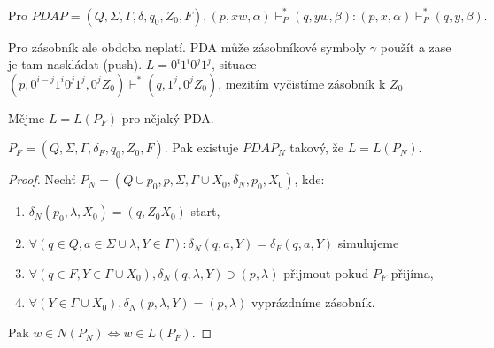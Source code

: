 \documentclass[../main.tex]{subfiles}
\begin{document}
    \begin{remark}
        \[\text{Pro } PDA P = (Q,\Sigma,\Gamma, \delta, q_0, Z_0, F), (p, xw, \alpha) \vdash^*_P (q, yw, \beta) : (p,x,\alpha)\vdash^*_P (q,y,\beta).\]

        Pro zásobník ale obdoba neplatí. PDA  může zásobníkové symboly $\gamma$ použít a zase je tam naskládat (push).
        $L = {0^i1^i0^j1^j}$, situace $(p, 0^{i-j}1^i0^j1^j, 0^jZ_0)\vdash^* (q,1^j, 0^j Z_0)$, mezitím vyčistíme zásobník k $Z_0$
    \end{remark}

    \begin{theorem}
        Mějme $L = L(P_F)$ pro nějaký PDA.

        $P_F = (Q,\Sigma, \Gamma, \delta_F, q_0, Z_0, F)$. Pak existuje $PDA P_N$ takový, že $L = L(P_N)$.

        \begin{proof}
            Nechť $P_N = (Q \cup {p_0, p}, \Sigma, \Gamma \cup {X_0}, \delta_N, p_0, X_0)$, kde:
            \begin{enumerate}
                \item $\delta_N(p_0,\lambda, X_0) = {(q,Z_0X_0)}$ start,
                \item $\forall(q\in Q, a \in \Sigma \cup {\lambda}, Y \in \Gamma) : \delta_N(q,a,Y) = \delta_F(q,a,Y)$ simulujeme
                \item $\forall(q \in F, Y \in \Gamma \cup {X_0}), \delta_N(q,\lambda, Y) \ni {(p,\lambda)}$ přijmout pokud $P_F$ přijíma,
                \item $\forall (Y \in \Gamma \cup {X_0}), \delta_N(p,\lambda, Y) = {(p,\lambda)}$ vyprázdníme zásobník. 
            \end{enumerate}
            Pak $w\in N(P_N) \Leftrightarrow w\in L(P_F).$
        \end{proof}
    \end{theorem}
\end{document}
